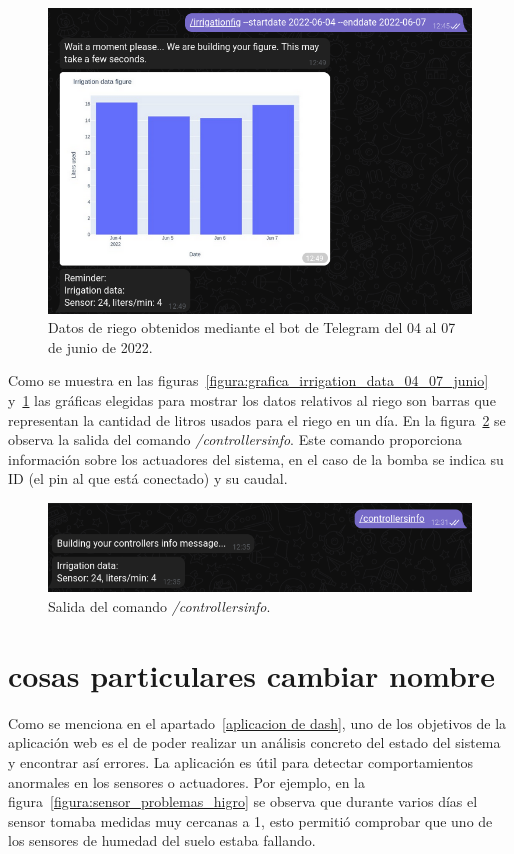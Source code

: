 \documentclass[a4paper, 12pt, oneside]{book}
\begin{document}
\begin{figure}[H]
	\centering
    \includegraphics[width=12cm, keepaspectratio]{img/irrigationfig_04_07_junio}
    \caption{Datos de riego obtenidos mediante el bot de Telegram del 04 al 07 de junio de 2022.}
    \label{figura:irrigationfig_04_07_junio}
\end{figure}

Como se muestra en las figuras~\ref{figura:grafica_irrigation_data_04_07_junio} y~\ref{figura:irrigationfig_04_07_junio} las gráficas elegidas para mostrar los datos relativos al riego son barras que representan la cantidad de litros usados para el riego en un día. En la figura~\ref{figura:comando controllers info} se observa la salida del comando \textit{/controllersinfo}. Este comando proporciona información sobre los actuadores del sistema, en el caso de la bomba se indica su ID (el pin al que está conectado) y su caudal.

\begin{figure}[H]
	\centering
    \includegraphics[width=12cm, keepaspectratio]{img/controllers_info}
    \caption{Salida del comando \textit{/controllersinfo}.}
    \label{figura:comando controllers info}
\end{figure}


\section{cosas particulares cambiar nombre}
\label{sec:cosas particulares cambiar nombre}
Como se menciona en el apartado~\ref{aplicacion de dash}, uno de los objetivos de la aplicación web es el de poder realizar un análisis concreto del estado del sistema y encontrar así errores.
La aplicación es útil para detectar comportamientos anormales en los sensores o actuadores. Por ejemplo, en la figura~\ref{figura:sensor_problemas_higro} se observa que durante varios días el sensor tomaba medidas muy cercanas a 1, esto permitió comprobar que uno de los sensores de humedad del suelo estaba fallando.
\end{document}
